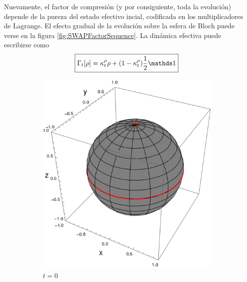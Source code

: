Nuevamente, el factor de compresión (y por consiguiente, toda la evolución) depende de la pureza del estado efectivo incial, codificada en los multiplicadores de Lagrange. El efecto gradual de la evolución sobre la esfera de Bloch puede verse en la figura \ref{fig:SWAPFactorSequence}. La dinámica efectiva puede escribirse como
\begin{equation}\label{eq:EffectiveSWAPt}
  \boxed{\Gamma_{t}[\rho]=\kappa_{t}^{\rho}\rho+(1-\kappa_{t}^{\rho})\frac{1}{2}\Id}
\end{equation}

\begin{figure}[ht!]
  \centering
  \begin{subfigure}{0.32\textwidth}
    \centering
    \includegraphics[width=0.9\linewidth]{chapter3/figures_toy/sphere_swapcontraction_t=0.0_z=0.9_p=0.9.png}
    \caption{$t=0$}
  \end{subfigure}%
  \begin{subfigure}{0.32\textwidth}
    \centering

\end{subfigure}
\end{figure}
